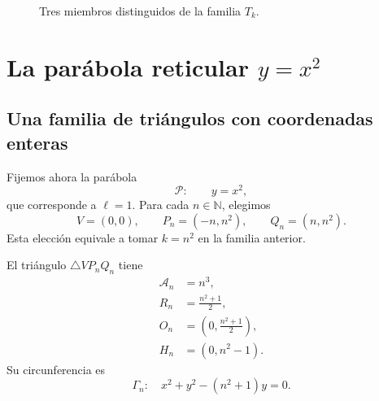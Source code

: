 \documentclass[11pt,a4paper,openany]{report}
\newcommand{\N}{\mathbb{N}}
\newcommand{\Area}{\mathcal{A}}
\begin{document}
\begin{figure}[H]
\centering
{}
\caption{Tres miembros distinguidos de la familia \(T_k\).}
\label{fig:three-special}
\end{figure}

\chapter{La parábola reticular \(y=x^2\)}

\section{Una familia de triángulos con coordenadas enteras}

Fijemos ahora la parábola
\[
 \mathcal P:\qquad y=x^2,
\]
que corresponde a \(\ell=1\). Para cada \(n\in\N\), elegimos
\begin{equation}
 V=(0,0),\qquad P_n=(-n,n^2),\qquad Q_n=(n,n^2).
 \label{eq:integer-triangle}
\end{equation}
Esta elección equivale a tomar \(k=n^2\) en la familia anterior.

\begin{proposition}
El triángulo \(\triangle VP_nQ_n\) tiene
\begin{align}
 \Area_n&=n^3,\label{eq:area-cube}\\
 R_n&=\frac{n^2+1}{2},\label{eq:Rn}\\
 O_n&=\left(0,\frac{n^2+1}{2}\right),\label{eq:On}\\
 H_n&=(0,n^2-1).\label{eq:Hn}
\end{align}
Su circunferencia es
\begin{equation}
 \Gamma_n:\quad x^2+y^2-(n^2+1)y=0.
 \label{eq:Gamma-n}
\end{equation}
\end{proposition}
\end{document}
